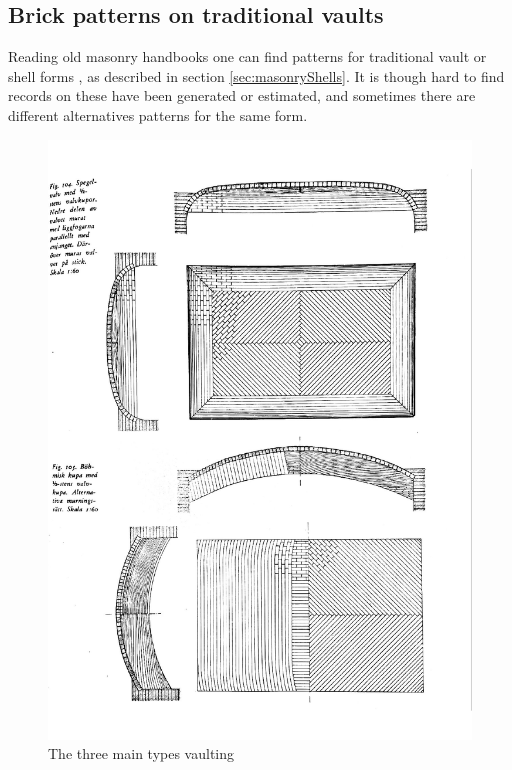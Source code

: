 \subsection{Brick patterns on traditional vaults}

Reading old masonry handbooks \cite{ref:murning} one can find patterns for traditional vault or shell forms , as described in section \ref{sec:masonryShells}. It is though hard to find records on these have been generated or estimated, and sometimes there are different alternatives patterns for the same form. 

\begin{figure}[H]
\centering
\includegraphics[height=0.8\linewidth ]{figure/Introduction/vaultin2.pdf}
\caption{The three main types vaulting}
\end{figure}


